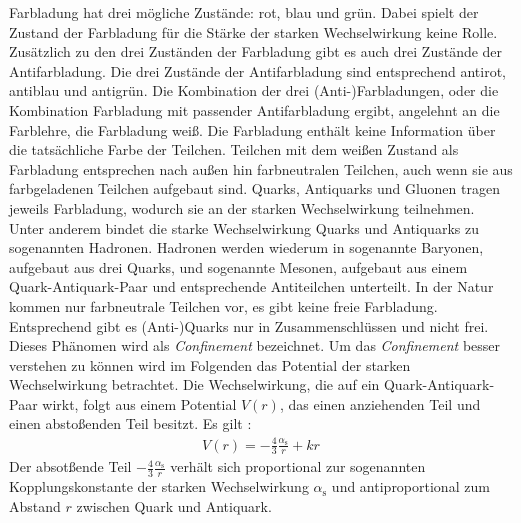 Farbladung hat drei m\"ogliche Zust\"ande: rot, blau und gr\"un.
Dabei spielt der Zustand der Farbladung f\"ur die St\"arke der starken Wechselwirkung keine Rolle.
Zus\"atzlich zu den drei Zust\"anden der Farbladung gibt es auch drei Zust\"ande der Antifarbladung. 
Die drei Zust\"ande der Antifarbladung sind entsprechend antirot, antiblau und antigr\"un.
Die Kombination der drei (Anti-)Farbladungen, oder die Kombination Farbladung mit passender Antifarbladung ergibt, angelehnt an die Farblehre, die Farbladung wei{\ss}.
Die Farbladung enth\"alt keine Information \"uber die tats\"achliche Farbe der Teilchen.
Teilchen mit dem wei{\ss}en Zustand als Farbladung entsprechen nach au{\ss}en hin farbneutralen Teilchen, auch wenn sie aus farbgeladenen Teilchen aufgebaut sind.
\newline
Quarks, Antiquarks und Gluonen tragen jeweils Farbladung, wodurch sie an der starken Wechselwirkung teilnehmen.
Unter anderem bindet die starke Wechselwirkung Quarks und Antiquarks zu sogenannten Hadronen. %
Hadronen werden wiederum in sogenannte Baryonen, aufgebaut aus drei Quarks, und sogenannte Mesonen, aufgebaut aus einem Quark-Antiquark-Paar und entsprechende Antiteilchen unterteilt.
In der Natur kommen nur farbneutrale Teilchen vor, es gibt keine freie Farbladung.
Entsprechend gibt es (Anti-)Quarks nur in Zusammenschl\"ussen und nicht frei. 
Dieses Ph\"anomen wird als \textit{Confinement} bezeichnet.
Um das \textit{Confinement} besser verstehen zu k\"onnen wird im Folgenden das Potential der starken Wechselwirkung betrachtet.
\newline
Die Wechselwirkung, die auf ein Quark-Antiquark-Paar wirkt, folgt aus einem Potential $V(r)$, das einen anziehenden Teil und einen abstoßenden Teil besitzt.
Es gilt \cite{script:kt1}:
\begin{align} \label{eq:Potential}
V(r) = -\frac{4}{3}\frac{\alpha_\text{s}}{r} + kr 
\end{align}
Der absot{\ss}ende Teil $-\frac{4}{3}\frac{\alpha_\text{s}}{r}$ verh\"alt sich proportional zur sogenannten Kopplungskonstante der starken Wechselwirkung $\alpha_{\text{s}}$ und antiproportional zum Abstand $r$ zwischen Quark und Antiquark.
